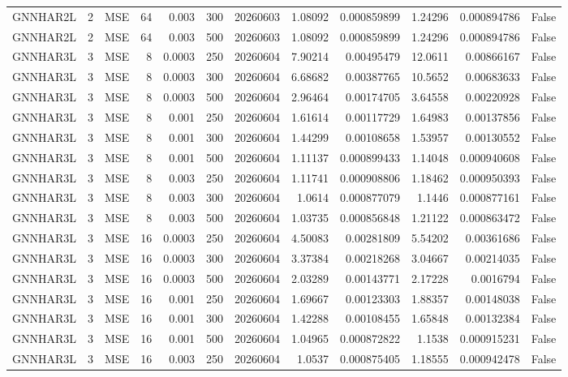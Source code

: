 \begin{tabular}{lrlrrrrrrrrr}
GNNHAR2L & 2 & MSE & 64 & 0.003 & 300 & 20260603 & 1.08092 & 0.000859899 & 1.24296 & 0.000894786 & False \\
GNNHAR2L & 2 & MSE & 64 & 0.003 & 500 & 20260603 & 1.08092 & 0.000859899 & 1.24296 & 0.000894786 & False \\
GNNHAR3L & 3 & MSE & 8 & 0.0003 & 250 & 20260604 & 7.90214 & 0.00495479 & 12.0611 & 0.00866167 & False \\
GNNHAR3L & 3 & MSE & 8 & 0.0003 & 300 & 20260604 & 6.68682 & 0.00387765 & 10.5652 & 0.00683633 & False \\
GNNHAR3L & 3 & MSE & 8 & 0.0003 & 500 & 20260604 & 2.96464 & 0.00174705 & 3.64558 & 0.00220928 & False \\
GNNHAR3L & 3 & MSE & 8 & 0.001 & 250 & 20260604 & 1.61614 & 0.00117729 & 1.64983 & 0.00137856 & False \\
GNNHAR3L & 3 & MSE & 8 & 0.001 & 300 & 20260604 & 1.44299 & 0.00108658 & 1.53957 & 0.00130552 & False \\
GNNHAR3L & 3 & MSE & 8 & 0.001 & 500 & 20260604 & 1.11137 & 0.000899433 & 1.14048 & 0.000940608 & False \\
GNNHAR3L & 3 & MSE & 8 & 0.003 & 250 & 20260604 & 1.11741 & 0.000908806 & 1.18462 & 0.000950393 & False \\
GNNHAR3L & 3 & MSE & 8 & 0.003 & 300 & 20260604 & 1.0614 & 0.000877079 & 1.1446 & 0.000877161 & False \\
GNNHAR3L & 3 & MSE & 8 & 0.003 & 500 & 20260604 & 1.03735 & 0.000856848 & 1.21122 & 0.000863472 & False \\
GNNHAR3L & 3 & MSE & 16 & 0.0003 & 250 & 20260604 & 4.50083 & 0.00281809 & 5.54202 & 0.00361686 & False \\
GNNHAR3L & 3 & MSE & 16 & 0.0003 & 300 & 20260604 & 3.37384 & 0.00218268 & 3.04667 & 0.00214035 & False \\
GNNHAR3L & 3 & MSE & 16 & 0.0003 & 500 & 20260604 & 2.03289 & 0.00143771 & 2.17228 & 0.0016794 & False \\
GNNHAR3L & 3 & MSE & 16 & 0.001 & 250 & 20260604 & 1.69667 & 0.00123303 & 1.88357 & 0.00148038 & False \\
GNNHAR3L & 3 & MSE & 16 & 0.001 & 300 & 20260604 & 1.42288 & 0.00108455 & 1.65848 & 0.00132384 & False \\
GNNHAR3L & 3 & MSE & 16 & 0.001 & 500 & 20260604 & 1.04965 & 0.000872822 & 1.1538 & 0.000915231 & False \\
GNNHAR3L & 3 & MSE & 16 & 0.003 & 250 & 20260604 & 1.0537 & 0.000875405 & 1.18555 & 0.000942478 & False \\

\end{tabular}
